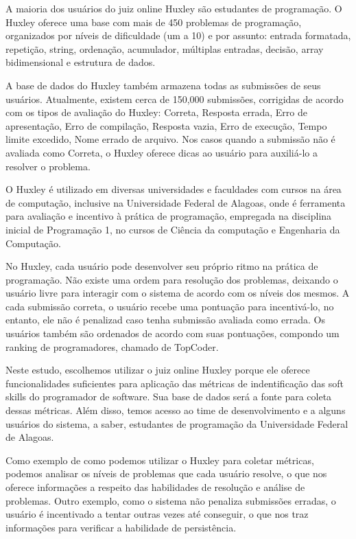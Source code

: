 A maioria dos usuários do juiz online Huxley são estudantes de programação. O Huxley oferece uma base com mais de 450 problemas de programação, organizados por níveis de dificuldade (um a 10) e por assunto: entrada formatada, repetição, string, ordenação, acumulador, múltiplas entradas, decisão, array bidimensional e estrutura de dados.

A base de dados do Huxley também armazena todas as submissões de seus usuários. Atualmente, existem cerca de 150,000 submissões, corrigidas de acordo com os tipos de avaliação do Huxley: Correta, Resposta errada, Erro de apresentação, Erro de compilação, Resposta vazia, Erro de execução, Tempo limite excedido, Nome errado de arquivo. 
Nos casos quando a submissão não é avaliada como Correta, o Huxley oferece dicas ao usuário para auxiliá-lo a resolver o problema. 

O Huxley é utilizado em diversas universidades e faculdades com cursos na área de computação, inclusive na Universidade Federal de Alagoas, onde é ferramenta para avaliação e incentivo à prática de programação, empregada na disciplina inicial de Programação 1, no cursos de Ciência da computação e Engenharia da Computação.

No Huxley, cada usuário pode desenvolver seu próprio ritmo na prática de programação. Não existe uma ordem para resolução dos problemas, deixando o usuário livre para interagir com o sistema de acordo com os níveis dos mesmos. A cada submissão correta, o usuário recebe uma pontuação para incentivá-lo, no entanto, ele não é penalizad caso tenha submissão avaliada como errada. Os usuários também são ordenados de acordo com suas pontuações, compondo um ranking de programadores, chamado de TopCoder.

Neste estudo, escolhemos utilizar o juiz online Huxley porque ele oferece funcionalidades suficientes para aplicação das métricas de indentificação das soft skills do programador de software. Sua base de dados será a fonte para coleta dessas métricas. Além disso, temos acesso ao time de desenvolvimento e a alguns usuários do sistema, a saber, estudantes de programação da Universidade Federal de Alagoas.

Como exemplo de como podemos utilizar o Huxley para coletar métricas, podemos analisar os níveis de problemas que cada usuário resolve, o que nos oferece informações a respeito das habilidades de resolução e análise de problemas. Outro exemplo, como o sistema não penaliza submissões erradas, o usuário é incentivado a tentar outras vezes até conseguir, o que nos traz informações para verificar a habilidade de persistência.

